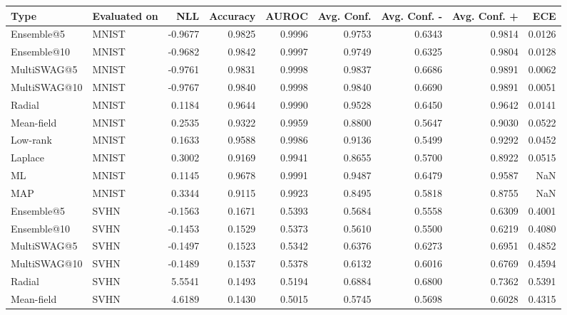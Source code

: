 \begin{tabular}{llrrrrrrr}
\toprule
        Type & Evaluated on &     NLL &  Accuracy &  AUROC &  Avg. Conf. &  Avg. Conf. - &  Avg. Conf. + &    ECE \\
\midrule
  Ensemble@5 &        MNIST & -0.9677 &    0.9825 & 0.9996 &      0.9753 &        0.6343 &        0.9814 & 0.0126 \\
 Ensemble@10 &        MNIST & -0.9682 &    0.9842 & 0.9997 &      0.9749 &        0.6325 &        0.9804 & 0.0128 \\
 MultiSWAG@5 &        MNIST & -0.9761 &    0.9831 & 0.9998 &      0.9837 &        0.6686 &        0.9891 & 0.0062 \\
MultiSWAG@10 &        MNIST & -0.9767 &    0.9840 & 0.9998 &      0.9840 &        0.6690 &        0.9891 & 0.0051 \\
      Radial &        MNIST &  0.1184 &    0.9644 & 0.9990 &      0.9528 &        0.6450 &        0.9642 & 0.0141 \\
  Mean-field &        MNIST &  0.2535 &    0.9322 & 0.9959 &      0.8800 &        0.5647 &        0.9030 & 0.0522 \\
    Low-rank &        MNIST &  0.1633 &    0.9588 & 0.9986 &      0.9136 &        0.5499 &        0.9292 & 0.0452 \\
     Laplace &        MNIST &  0.3002 &    0.9169 & 0.9941 &      0.8655 &        0.5700 &        0.8922 & 0.0515 \\
          ML &        MNIST &  0.1145 &    0.9678 & 0.9991 &      0.9487 &        0.6479 &        0.9587 &    NaN \\
         MAP &        MNIST &  0.3344 &    0.9115 & 0.9923 &      0.8495 &        0.5818 &        0.8755 &    NaN \\
  Ensemble@5 &         SVHN & -0.1563 &    0.1671 & 0.5393 &      0.5684 &        0.5558 &        0.6309 & 0.4001 \\
 Ensemble@10 &         SVHN & -0.1453 &    0.1529 & 0.5373 &      0.5610 &        0.5500 &        0.6219 & 0.4080 \\
 MultiSWAG@5 &         SVHN & -0.1497 &    0.1523 & 0.5342 &      0.6376 &        0.6273 &        0.6951 & 0.4852 \\
MultiSWAG@10 &         SVHN & -0.1489 &    0.1537 & 0.5378 &      0.6132 &        0.6016 &        0.6769 & 0.4594 \\
      Radial &         SVHN &  5.5541 &    0.1493 & 0.5194 &      0.6884 &        0.6800 &        0.7362 & 0.5391 \\
  Mean-field &         SVHN &  4.6189 &    0.1430 & 0.5015 &      0.5745 &        0.5698 &        0.6028 & 0.4315 \\

\end{tabular}
